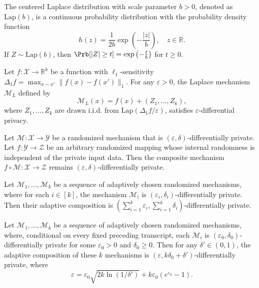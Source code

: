 \begin{definition}
\label{def:laplace-dist}
The centered Laplace distribution with scale parameter $b > 0$, denoted as $\text{Lap}(b)$, is a continuous probability distribution with the probability density function
\[
    h(z) = \frac{1}{2b} \exp\left(-\frac{|z|}{b}\right), \quad z \in \mathbb{R}.
\]
If $Z \sim \text{Lap}(b)$, then $\Prb[|Z| \ge t] = \exp\left(-\frac{t}{b}\right)$ for $t\geq 0$.
\end{definition}

\begin{lemma}
\label{lem:laplace-mech}
Let $f \colon \mathcal{X} \to \mathbb{R}^k$ be a function with $\ell_1$-sensitivity $\Delta_1 f = \max_{x \sim x'} \|f(x) - f(x')\|_1$. For any $\varepsilon > 0$, the Laplace mechanism $\mathcal{M}_L$ defined by
\[
    \mathcal{M}_L(x) = f(x) + (Z_1, \dots, Z_k),
\]
where $Z_1, \dots, Z_k$ are drawn i.i.d. from $\text{Lap}(\Delta_1 f / \varepsilon)$, satisfies $\varepsilon$-differential privacy.
\end{lemma}

\begin{lemma}
\label{lem:post-processing}
Let $\mathcal{M} \colon \mathcal{X} \to \mathcal{Y}$ be a randomized mechanism that is $(\varepsilon, \delta)$-differentially private. Let $f \colon \mathcal{Y} \to \mathcal{Z}$ be an arbitrary randomized mapping whose internal randomness is independent of the private input data. Then the composite mechanism $f \circ \mathcal{M} \colon \mathcal{X} \to \mathcal{Z}$ remains $(\varepsilon, \delta)$-differentially private.
\end{lemma}

\begin{lemma}
\label{lem:basic-composition}
Let $\mathcal{M}_1, \dots, \mathcal{M}_k$ be a sequence of adaptively chosen randomized mechanisms, where for each $i \in [k]$, the mechanism $\mathcal{M}_i$ is $(\varepsilon_i, \delta_i)$-differentially private. Then their adaptive composition is $\left( \sum_{i=1}^k \varepsilon_i, \sum_{i=1}^k \delta_i \right)$-differentially private.
\end{lemma}

\begin{lemma}
\label{lem:advanced-composition}
Let $\mathcal{M}_1, \dots, \mathcal{M}_k$ be a sequence of adaptively chosen randomized mechanisms, where, conditional on every fixed preceding transcript, each $\mathcal{M}_i$ is $(\varepsilon_0, \delta_0)$-differentially private for some $\varepsilon_0 > 0$ and $\delta_0 \ge 0$. Then for any $\delta'\in(0,1)$, the adaptive composition of these $k$ mechanisms is $(\varepsilon, k\delta_0 + \delta')$-differentially private, where
$$
   \varepsilon = \varepsilon_0 \sqrt{2k \ln(1/\delta')} + k \varepsilon_0 (e^{\varepsilon_0} - 1).
$$
\end{lemma}

